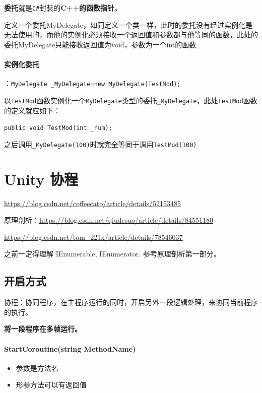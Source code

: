 \documentclass[UTF8,a4paper,12pt]{ctexbook}
\begin{document}
			\textbf{委托}就是\verb|C#|封装的\textbf{C++的函数指针}。
			
			定义一个委托MyDelegate，如同定义一个类一样，此时的委托没有经过实例化是无法使用的，而他的实例化必须接收一个返回值和参数都与他等同的函数，此处的委托MyDelegate只能接收返回值为void，参数为一个int的函数
			
		\paragraph{实例化委托}：\verb|MyDelegate _MyDelegate=new MyDelegate(TestMod);|
			
			以\verb|TestMod|函数实例化一个\verb|MyDelegate|类型的委托\verb|_MyDelegate|，此处\verb|TestMod|函数的定义就应如下：
				
			\verb|public void TestMod(int _num);|
				
			之后调用\verb|_MyDelegate(100)|时就完全等同于调用\verb|TestMod(100)|
		
		
		
	\section{Unity 协程}
		\url{https://blog.csdn.net/coffeecato/article/details/52153485}
		
		原理剖析：\url{https://blog.csdn.net/qiudesuo/article/details/84551180}
		
		\url{https://blog.csdn.net/tom_221x/article/details/78546037}
		
		
		之前一定得理解 IEnumerable, IEnumerator. 参考原理剖析第一部分。
		
		\subsection{开启方式}
			协程：协同程序，在主程序运行的同时，开启另外一段逻辑处理，来协同当前程序的执行。
			
			\textbf{将一段程序在多帧运行。}
			
			\paragraph{StartCoroutine(string MethodName)}
				\begin{itemize}
					\item 参数是方法名					
					\item 形参方法可以有返回值
				\end{itemize}
			
\end{document}

